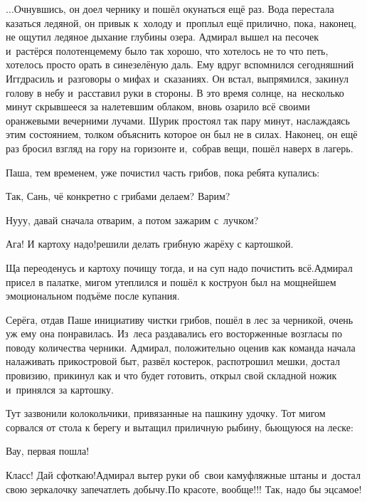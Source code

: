\vspace{0.1cm}
$\ldots$Очнувшись, он доел чернику и пошёл окунаться ещё раз. Вода перестала казаться ледяной, он привык к~холоду и~проплыл ещё прилично, пока, наконец, не ощутил ледяное дыхание глубины озера. Адмирал вышел на песочек и~растёрся полотенцем\mdash ему было так хорошо, что хотелось не то что петь, хотелось просто орать в сине\sdash зелёную даль. Ему вдруг вспомнился сегодняшний Иггдрасиль и~разговоры о мифах и~сказаниях. Он встал, выпрямился, закинул голову в небу и~расставил руки в стороны. В это время солнце, на~несколько минут скрывшееся за налетевшим облаком, вновь озарило всё своими оранжевыми вечерними лучами. Шурик простоял так пару минут, наслаждаясь этим состоянием, толком объяснить которое он был не в силах. Наконец, он ещё раз бросил взгляд на гору на горизонте и,~собрав вещи, пошёл наверх в лагерь.

Паша, тем временем, уже почистил часть грибов, пока ребята купались:

\diagdash Так, Сань, чё конкретно с грибами делаем? Варим?%

\diagdash Ну\sdash у\sdash у, давай сначала отварим, а потом зажарим с~лучком?

\diagdash Ага! И картоху надо!\mdash решили делать грибную жарёху с картошкой.

\diagdash Ща переоденусь и картоху почищу тогда, и на суп надо почистить всё.\mdash Адмирал присел в палатке, мигом утеплился и пошёл к костру\mdash он был на мощнейшем эмоциональном подъёме после купания.

Серёга, отдав Паше инициативу чистки грибов, пошёл в лес за черникой, очень уж ему она понравилась. Из~леса раздавались его восторженные возгласы по поводу количества черники. Адмирал, положительно оценив как команда начала налаживать прикостровой быт, развёл костерок, распотрошил мешки, достал провизию, прикинул как и что будет готовить, открыл свой складной ножик и~принялся за картошку.

Тут зазвонили колокольчики, привязанные на пашкину удочку. Тот мигом сорвался от стола к берегу и вытащил приличную рыбину, бьющуюся на леске:

\diagdash Вау, первая пошла!


\diagdash Класс! Дай сфоткаю!\mdash Адмирал вытер руки об~свои камуфляжные штаны и~достал свою зеркалочку запечатлеть добычу.\mdash По красоте, вообще!!! Так, надо бы эц\sdash самое!

